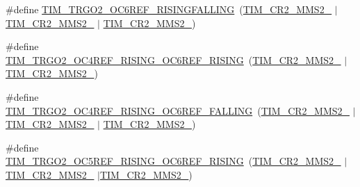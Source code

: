 \begin{DoxyCompactItemize}
\item 
\#define \mbox{\hyperlink{group___t_i_m___master___mode___selection__2_gaefa63d8189e6e6fcd592fcf4af8aa416}{T\+I\+M\+\_\+\+T\+R\+G\+O2\+\_\+\+O\+C6\+R\+E\+F\+\_\+\+R\+I\+S\+I\+N\+G\+F\+A\+L\+L\+I\+NG}}~(\mbox{\hyperlink{group___peripheral___registers___bits___definition_ga3503937610adbf78153c1fcfa4bcd6ea}{T\+I\+M\+\_\+\+C\+R2\+\_\+\+M\+M\+S2\+\_}} $\vert$ \mbox{\hyperlink{group___peripheral___registers___bits___definition_ga0248e35956d0d22ac66dcd67aab317c5}{T\+I\+M\+\_\+\+C\+R2\+\_\+\+M\+M\+S2\+\_}} $\vert$ \mbox{\hyperlink{group___peripheral___registers___bits___definition_ga07efe60d8d7305b78085233ddaecb990}{T\+I\+M\+\_\+\+C\+R2\+\_\+\+M\+M\+S2\+\_}})
\item 
\#define \mbox{\hyperlink{group___t_i_m___master___mode___selection__2_ga367b1addfd2f36bb8ed29e8e70e57024}{T\+I\+M\+\_\+\+T\+R\+G\+O2\+\_\+\+O\+C4\+R\+E\+F\+\_\+\+R\+I\+S\+I\+N\+G\+\_\+\+O\+C6\+R\+E\+F\+\_\+\+R\+I\+S\+I\+NG}}~(\mbox{\hyperlink{group___peripheral___registers___bits___definition_ga3503937610adbf78153c1fcfa4bcd6ea}{T\+I\+M\+\_\+\+C\+R2\+\_\+\+M\+M\+S2\+\_}} $\vert$ \mbox{\hyperlink{group___peripheral___registers___bits___definition_gaa49670c71a446e5201994716b08b1527}{T\+I\+M\+\_\+\+C\+R2\+\_\+\+M\+M\+S2\+\_}})
\item 
\#define \mbox{\hyperlink{group___t_i_m___master___mode___selection__2_ga202fe63f92ca564cb18995a11b3946b2}{T\+I\+M\+\_\+\+T\+R\+G\+O2\+\_\+\+O\+C4\+R\+E\+F\+\_\+\+R\+I\+S\+I\+N\+G\+\_\+\+O\+C6\+R\+E\+F\+\_\+\+F\+A\+L\+L\+I\+NG}}~(\mbox{\hyperlink{group___peripheral___registers___bits___definition_ga3503937610adbf78153c1fcfa4bcd6ea}{T\+I\+M\+\_\+\+C\+R2\+\_\+\+M\+M\+S2\+\_}} $\vert$ \mbox{\hyperlink{group___peripheral___registers___bits___definition_gaa49670c71a446e5201994716b08b1527}{T\+I\+M\+\_\+\+C\+R2\+\_\+\+M\+M\+S2\+\_}} $\vert$ \mbox{\hyperlink{group___peripheral___registers___bits___definition_ga07efe60d8d7305b78085233ddaecb990}{T\+I\+M\+\_\+\+C\+R2\+\_\+\+M\+M\+S2\+\_}})
\item 
\#define \mbox{\hyperlink{group___t_i_m___master___mode___selection__2_ga98299af57d50ec9a0dc1fbd3d4d04c39}{T\+I\+M\+\_\+\+T\+R\+G\+O2\+\_\+\+O\+C5\+R\+E\+F\+\_\+\+R\+I\+S\+I\+N\+G\+\_\+\+O\+C6\+R\+E\+F\+\_\+\+R\+I\+S\+I\+NG}}~(\mbox{\hyperlink{group___peripheral___registers___bits___definition_ga3503937610adbf78153c1fcfa4bcd6ea}{T\+I\+M\+\_\+\+C\+R2\+\_\+\+M\+M\+S2\+\_}} $\vert$ \mbox{\hyperlink{group___peripheral___registers___bits___definition_gaa49670c71a446e5201994716b08b1527}{T\+I\+M\+\_\+\+C\+R2\+\_\+\+M\+M\+S2\+\_}} $\vert$\mbox{\hyperlink{group___peripheral___registers___bits___definition_ga0248e35956d0d22ac66dcd67aab317c5}{T\+I\+M\+\_\+\+C\+R2\+\_\+\+M\+M\+S2\+\_}})

\end{DoxyCompactItemize}
